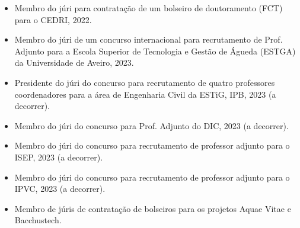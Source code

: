 \documentclass[11pt]{article}
\begin{document}
\begin{itemize}
\item {Membro do júri para contratação de um bolseiro de doutoramento (FCT) para o CEDRI, 2022.}
\item {Membro do júri de um concurso internacional para recrutamento de Prof. Adjunto para a Escola Superior de Tecnologia e Gestão de Águeda (ESTGA) da Universidade de Aveiro, 2023.}
\item {Presidente do júri do concurso para recrutamento de quatro professores coordenadores para a área de Engenharia Civil da ESTiG, IPB, 2023 (a decorrer).}
\item {Membro do júri do concurso para Prof. Adjunto do DIC, 2023 (a decorrer).}
\item {Membro do júri do concurso para recrutamento de professor adjunto para o ISEP, 2023 (a decorrer).}
\item {Membro do júri do concurso para recrutamento de professor adjunto para o IPVC, 2023 (a decorrer).}
\item {Membro de júris de contratação de bolseiros para os projetos Aquae Vitae e Bacchustech.}
\end{itemize}
\end{document}
